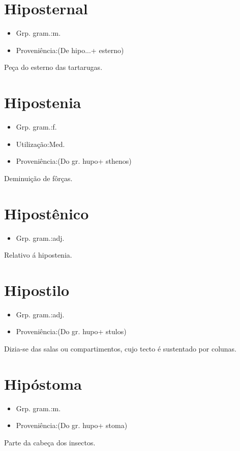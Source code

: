 \documentclass{article}
\begin{document}
\section{Hiposternal}
\begin{itemize}
\item {Grp. gram.:m.}
\end{itemize}
\begin{itemize}
\item {Proveniência:(De \textunderscore hipo...\textunderscore  + \textunderscore esterno\textunderscore )}
\end{itemize}
Peça do esterno das tartarugas.
\section{Hipostenia}
\begin{itemize}
\item {Grp. gram.:f.}
\end{itemize}
\begin{itemize}
\item {Utilização:Med.}
\end{itemize}
\begin{itemize}
\item {Proveniência:(Do gr. \textunderscore hupo\textunderscore  + \textunderscore sthenos\textunderscore )}
\end{itemize}
Deminuição de fôrças.
\section{Hipostênico}
\begin{itemize}
\item {Grp. gram.:adj.}
\end{itemize}
Relativo á hipostenia.
\section{Hipostilo}
\begin{itemize}
\item {Grp. gram.:adj.}
\end{itemize}
\begin{itemize}
\item {Proveniência:(Do gr. \textunderscore hupo\textunderscore  + \textunderscore stulos\textunderscore )}
\end{itemize}
Dizia-se das salas ou compartimentos, cujo tecto é sustentado por colunas.
\section{Hipóstoma}
\begin{itemize}
\item {Grp. gram.:m.}
\end{itemize}
\begin{itemize}
\item {Proveniência:(Do gr. \textunderscore hupo\textunderscore  + \textunderscore stoma\textunderscore )}
\end{itemize}
Parte da cabeça dos insectos.
\end{document}
